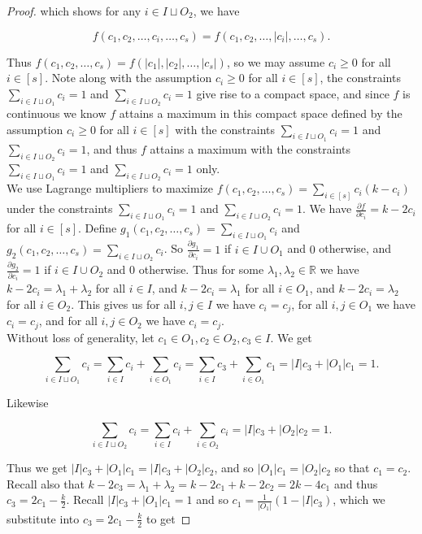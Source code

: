 \documentclass{article}
\begin{document}
\begin{proof}
\noindent 
which shows for any $i \in I \sqcup O_2$, we have 

$$f(c_1,c_2, \ldots, c_i, \ldots, c_s) = f(c_1,c_2, \ldots, |c_i|, \ldots, c_s).$$ 

\noindent
Thus $f(c_1,c_2,\ldots,c_s) = f(|c_1|,|c_2|,\ldots,|c_s|)$, so we may assume $c_i \geq 0$ for all $i \in [s]$. Note along with the assumption $c_i \geq 0$ for all $i \in [s]$, the constraints $\sum_{i \in I \sqcup O_1} c_i = 1$ and $\sum_{i \in I \sqcup O_2 } c_i = 1$ give rise to a compact space, and since $f$ is continuous we know $f$ attains a maximum in this compact space defined by the assumption $c_i \geq 0$ for all $i \in [s]$ with the constraints $\sum_{i \in I \sqcup O_1} c_i = 1$ and $\sum_{i \in I \sqcup O_2 } c_i = 1$, and thus $f$ attains a maximum with the constraints $\sum_{i \in I \sqcup O_1} c_i = 1$ and $\sum_{i \in I \sqcup O_2 } c_i = 1$ only. \\

We use Lagrange multipliers to maximize $f(c_1,c_2,\ldots,c_{s}) = \sum_{i \in [s]} c_i(k-c_i)$ under the constraints $\sum_{i \in I \sqcup O_1} c_i = 1$ and $\sum_{i \in I \sqcup O_2 } c_i = 1$. We have $\frac{\partial f}{\partial c_i} = k - 2c_i$ for all $i \in [s]$. Define $g_1(c_1,c_2,\ldots,c_s) = \sum_{i \in I \sqcup O_1} c_i$ and $g_2(c_1,c_2,\ldots,c_s) = \sum_{i \in I \sqcup O_2 } c_i$. So $\frac{\partial g_1}{\partial c_i} = 1$ if $i \in I \cup O_1$ and $0$ otherwise, and $\frac{\partial g_2}{\partial c_i} = 1$ if $i \in I \cup O_2$ and $0$ otherwise. Thus for some $\lambda_1,\lambda_2 \in \mathbb{R}$ we have 
$k-2c_i = \lambda_1+\lambda_2$ for all $i \in I$, and $k-2c_i = \lambda_1$ for all $i \in O_1$, and $k-2c_i = \lambda_2$ for all $i \in O_2$. This gives us for all $i,j \in I$ we have $c_i = c_j$, for all $i,j \in O_1$ we have $c_i = c_j$, and for all $i,j \in O_2$ we have $c_i = c_j$. \\

Without loss of generality, let $c_1 \in O_1, c_2 \in O_2, c_3 \in I$. We get 

$$\sum_{i \in I \sqcup O_1} c_i = \sum_{i \in I} c_i + \sum_{i \in O_1} c_i = \sum_{i \in I} c_3 + \sum_{i \in O_1} c_1 = |I|c_3 + |O_1|c_1 = 1.$$

\noindent
Likewise

$$\sum_{i \in I \sqcup O_2} c_i = \sum_{i \in I}c_i + \sum_{i \in O_2}c_i = |I|c_3 + |O_2|c_2 = 1.$$

\noindent
Thus we get $|I|c_3 + |O_1|c_1 =|I|c_3 + |O_2|c_2$, and so $|O_1|c_1 = |O_2|c_2$ so that $c_1 = c_2$. Recall also that $k-2c_3 = \lambda_1 + \lambda_2 = k-2c_1+k-2c_2  = 2k-4c_1$ and thus $c_3 = 2c_1-\frac{k}{2}$. Recall $|I|c_3 + |O_1|c_1 = 1$ and so $c_1 = \frac{1}{|O_1|}(1-|I|c_3)$, which we substitute into $c_3 = 2c_1-\frac{k}{2}$ to get 


\end{proof}
\end{document}
